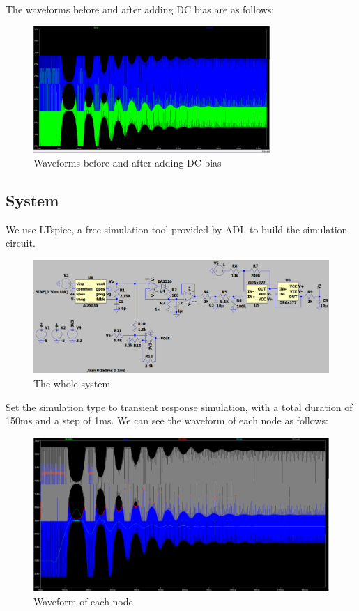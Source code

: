 The waveforms before and after adding DC bias are as follows:

\begin{figure}[H]
\centering
\includegraphics[width=0.8\textwidth]{./2023Mar/WaveAddDC.png}
\caption{Waveforms before and after adding DC bias}
\label{WaveAddDC}
\end{figure}

\subsection*{System}

We use LTspice, a free simulation tool provided by ADI, to build the simulation circuit.

\begin{figure}[H]
\centering
\includegraphics[width=1\textwidth]{./2023Mar/system.png}
\caption{The whole system}
\label{system}
\end{figure}

Set the simulation type to transient response simulation, with a total duration of 150ms and a step of 1ms. We can see the waveform of each node as follows:

\begin{figure}[H]
\centering
\includegraphics[width=1\textwidth]{./2023Mar/WaveAll.png}
\caption{Waveform of each node}
\label{WaveAll}
\end{figure}

